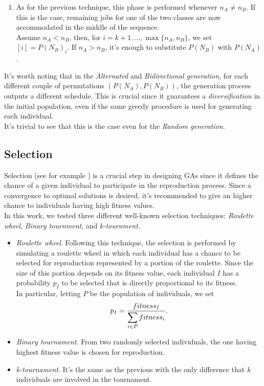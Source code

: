 \documentclass[opre,nonblindrev]{informs3} %
\begin{document}
\begin{itemize}
\begin{enumerate}
		\item As for the previous technique, this phase is performed whenever $n_A \ne n_B$. If this is the case, remaining jobs for one of the two classes are now accommodated in the middle of the sequence. \\Assume $n_A<n_B$, then, for $i=k+1,\ldots,\max\{n_A,n_B\}$, we set $[i] = P(N_B)_i.$ If $n_A>n_B$, it's enough to substitute $P(N_B)$ with $P(N_A)$. 
	\end{enumerate}
	It's worth noting that in the \textit{Alternated} and \textit{Bidirectional generation}, for each different couple of permutations $(P(N_A),P(N_B))$, the generation process outputs a different schedule. This is crucial since it guarantees a \textit{diversification} in the initial population, even if the same greedy procedure is used for generating each individual.\\ It's trivial to see that this is the case even for the \textit{Random generation.}
\end{itemize}
\subsection{Selection}
Selection (see for example \cite{sel1}) is a crucial step in designing GAs since it defines the chance of a given individual to participate in the reproduction process. Since a convergence to optimal solutions is desired, it's recommended to give an higher chance to individuals having high fitness values.\\
In this work, we tested three different well-known selection techniques: \textit{Roulette wheel}, \textit{Binary tournment}, and \textit{k-tournment.}
\begin{itemize}
	\item \textit{Roulette wheel}. Following this technique, the selection is performed by simulating a roulette wheel in which each individual has a chance to be selected for reproduction represented by a portion of the roulette. Since the size of this portion depends on its fitness value, each individual $I$ has a probability $p_I$ to be selected that is directly proportional to its fitness.\\In particular, letting $P$ be the population of individuals, we set $$p_I = \frac{fitness_I}{\displaystyle\sum_{i \in P}fitness_i}.$$
	\item \textit{Binary tournament}. From two randomly selected individuals, the one having highest fitness value is chosen for reproduction.
	\item \textit{k-tournament}. It's the same as the previous with the only difference that $k$ individuals are involved in the tournament. 
\end{itemize}
\end{document}
